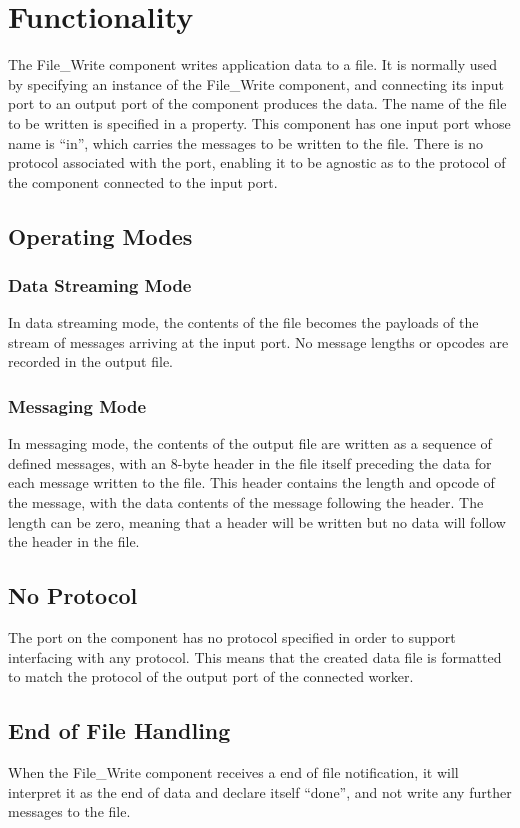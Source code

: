 \def\name{\comp}
\def\workertype{Application}
\def\version{\ocpiversion}
\def\releasedate{4/2019}
\def\componentlibrary{ocpi.core}
\def\workers{file\_{}write.hdl file\_{}write.rcc}
\def\testedplatforms{centos7, isim, modelsim, xilinx13\_{}3, xilinx13\_{}4, xsim}


\section*{Functionality}
\begin{flushleft}
The File\_Write component writes application data to a file. It is normally used by
specifying an instance of the File\_Write component, and connecting its input port to an
output port of the component produces the data. The name of the file to be written is
specified in a property.
This component has one input port whose name is ``in'', which carries the messages to
be written to the file. There is no protocol associated with the port, enabling it to be
agnostic as to the protocol of the component connected to the input port.
\subsection*{Operating Modes}
\subsubsection*{Data Streaming Mode}
In data streaming mode, the contents of the file becomes the payloads of the stream of
messages arriving at the input port. No message lengths or opcodes are recorded in
the output file.
\newpage
\subsubsection*{Messaging Mode}
In messaging mode, the contents of the output file are written as a sequence of defined
messages, with an 8-byte header in the file itself preceding the data for each message
written to the file. This header contains the length and opcode of the message, with the
data contents of the message following the header. The length can be zero, meaning
that a header will be written but no data will follow the header in the file.\\
\medskip \medskip

\subsection*{No Protocol}
The port on the component has no protocol specified in order to support interfacing with any protocol.  This means that the created data file is formatted to match the protocol of the output port of the connected worker.
\subsection*{End of File Handling}
When the File\_Write component receives a end of file notification, it will interpret it as
the end of data and declare itself ``done'', and not write any further messages to the file.
\end{flushleft}

